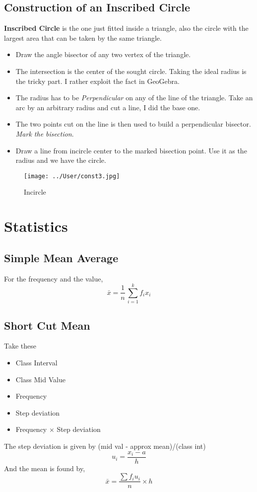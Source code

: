 \documentclass[10pt,a4paper,landscape]{article}
\begin{document}
\subsection{Construction of an Inscribed Circle}
\textbf{Inscribed Circle} is the one just fitted inside a triangle, also the circle with the largest area that can be taken by the same triangle.
\begin{itemize}
\item Draw the angle bisector of any two vertex of the triangle. 
\item The intersection is the center of the sought circle. Taking the ideal radius is the tricky part. I rather exploit the fact in GeoGebra.
\item The radius has to be \emph{Perpendicular} on any of the line of the triangle. Take an arc by an arbitrary radius and cut a line, I did the base one.
\item The two points cut on the line is then used to build a perpendicular bisector. \emph{Mark the bisection}.
\item Draw a line from incircle center to the marked bisection point. Use it as the radius and we have the circle.
\end{itemize}

\begin{figure}[hbtp]
\centering
\texttt{[image: ../User/const3.jpg]}
\caption{Incircle}
\end{figure}

\section{Statistics}
\subsection{Simple Mean Average}
For the frequency and the value,
\[ \bar{x} = \frac{1}{n} \,	\sum_{i=1}^{k} f_i x_i \]

\subsection{Short Cut Mean}
Take these
\begin{itemize}
\item Class Interval
\item Class Mid Value
\item Frequency
\item Step deviation
\item Frequency $\times$ Step deviation
\end{itemize}
The step deviation is given by (mid val - approx mean)/(class int)
\[ u_i = \frac{x_i - a}{h}
\]
And the mean is found by,
\[ \bar{x} = \frac{ \sum f_i u_i      }{n} \times h
\]
\end{document}
